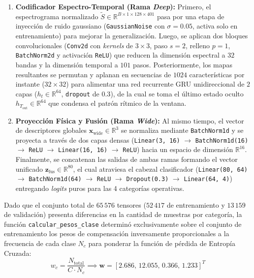 \documentclass[11pt, a4paper]{article}
\begin{document}
\begin{enumerate}
    \item[1)] \textbf{Codificador Espectro-Temporal (Rama \textit{Deep}):} Primero, el espectrograma normalizado $\tilde{S} \in \mathbb{R}^{B \times 1 \times 128 \times 401}$ pasa por una etapa de inyección de ruido gaussiano (\texttt{GaussianNoise} con $\sigma = 0.05$, activa solo en entrenamiento) para mejorar la generalización. Luego, se aplican dos bloques convolucionales (\texttt{Conv2d} con \textit{kernels} de $3\times 3$, paso $s=2$, relleno $p=1$, \texttt{BatchNorm2d} y activación \texttt{ReLU}) que reducen la dimensión espectral a $32$ bandas y la dimensión temporal a $101$ pasos. Posteriormente, los mapas resultantes se permutan y aplanan en secuencias de $1024$ características por instante ($32 \times 32$) para alimentar una red recurrente GRU unidireccional de $2$ capas ($h_t \in \mathbb{R}^{64}$, \texttt{dropout} de $0.3$), de la cual se toma el último estado oculto $h_{T_{\text{out}}} \in \mathbb{R}^{64}$ que condensa el patrón rítmico de la ventana.
    \item[2)] \textbf{Proyección Física y Fusión (Rama \textit{Wide}):} Al mismo tiempo, el vector de descriptores globales $\mathbf{x}_{\text{wide}} \in \mathbb{R}^3$ se normaliza mediante \texttt{BatchNorm1d} y se proyecta a través de dos capas densas (\texttt{Linear(3, 16)} $\to$ \texttt{BatchNorm1d(16)} $\to$ \texttt{ReLU} $\to$ \texttt{Linear(16, 16)} $\to$ \texttt{ReLU}) hacia un espacio de dimensión $\mathbb{R}^{16}$. Finalmente, se concatenan las salidas de ambas ramas formando el vector unificado $\mathbf{z}_{\text{fus}} \in \mathbb{R}^{80}$, el cual atraviesa el cabezal clasificador (\texttt{Linear(80, 64)} $\to$ \texttt{BatchNorm1d(64)} $\to$ \texttt{ReLU} $\to$ \texttt{Dropout(0.3)} $\to$ \texttt{Linear(64, 4)}) entregando \textit{logits} puros para las 4 categorías operativas.
\end{enumerate}

Dado que el conjunto total de $65\,576$ tensores ($52\,417$ de entrenamiento y $13\,159$ de validación) presenta diferencias en la cantidad de muestras por categoría, la función \texttt{calcular\_pesos\_clase} determinó exclusivamente sobre el conjunto de entrenamiento los pesos de compensación inversamente proporcionales a la frecuencia de cada clase $N_c$ para ponderar la función de pérdida de Entropía Cruzada:
\begin{equation}
    w_c = \frac{N_{\text{total}}}{C \cdot N_c} \implies \mathbf{w} = [2.686, \, 12.055, \, 0.366, \, 1.233]^T
\end{equation}
\end{document}
